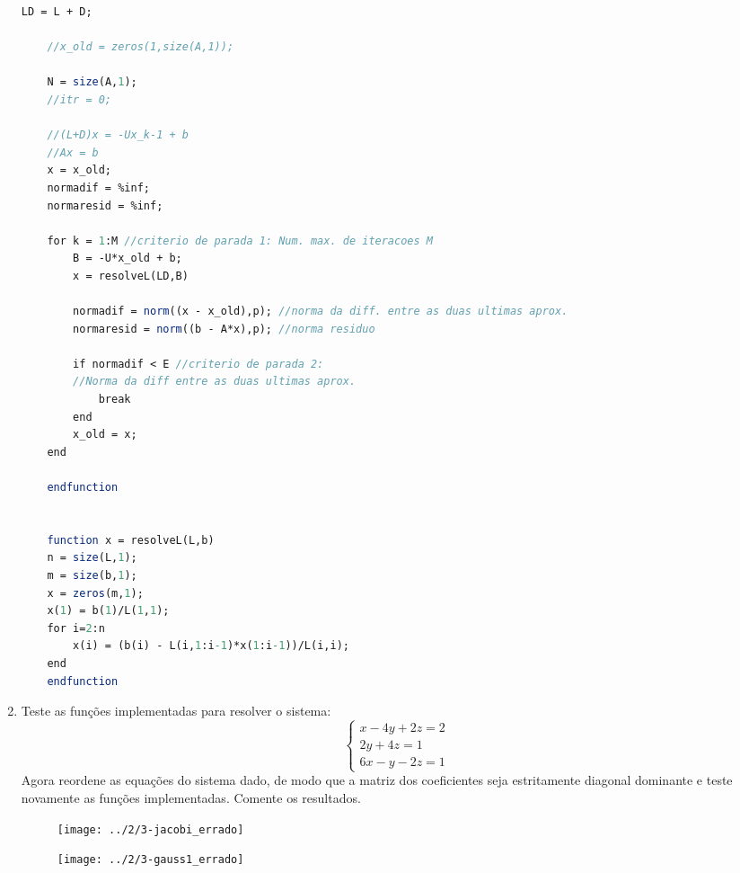 \documentclass[leqno]{article}
\numberwithin{equation}{section}
\begin{document}
\begin{enumerate}
\begin{sol}
\begin{lstlisting}[language=Scilab]
	LD = L + D;
	
	//x_old = zeros(1,size(A,1));
	
	N = size(A,1);
	//itr = 0;
	
	//(L+D)x = -Ux_k-1 + b
	//Ax = b
	x = x_old;
	normadif = %inf;
	normaresid = %inf;
	
	for k = 1:M //criterio de parada 1: Num. max. de iteracoes M
		B = -U*x_old + b;
		x = resolveL(LD,B)
	
		normadif = norm((x - x_old),p); //norma da diff. entre as duas ultimas aprox.
		normaresid = norm((b - A*x),p); //norma residuo
	
		if normadif < E //criterio de parada 2: 
		//Norma da diff entre as duas ultimas aprox.
			break
		end
		x_old = x;
	end
	
	endfunction
	
	
	function x = resolveL(L,b)
	n = size(L,1);
	m = size(b,1);
	x = zeros(m,1);
	x(1) = b(1)/L(1,1);
	for i=2:n
		x(i) = (b(i) - L(i,1:i-1)*x(1:i-1))/L(i,i);
	end
	endfunction
	\end{lstlisting}
		\end{sol}
		
		\item 
	
		Teste as funções implementadas para resolver o sistema:		
		\begin{equation}
			\left\{\begin{split}
				x - 4y + 2z = 2 \\
				2y + 4z = 1 \\
				6x - y - 2z = 1 
			\end{split}\right.
		\end{equation}
		Agora reordene as equações do sistema dado, de modo que a
		matriz dos coeficientes seja estritamente diagonal dominante e
		teste novamente as funções implementadas. Comente os
		resultados.
		\begin{sol}
			\begin{figure}[H]
				\centering
				\texttt{[image: ../2/3-jacobi\_errado]}
			\end{figure}
		
			\begin{figure}[H]
				\centering
				\texttt{[image: ../2/3-gauss1\_errado]}
			\end{figure}
		

\end{sol}
\end{enumerate}
\end{document}
